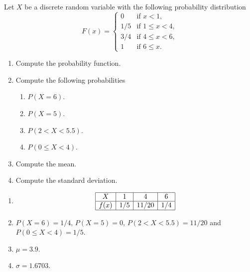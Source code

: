 {Let $X$ be a discrete random variable with the following probability distribution
\[
F(x)=
\begin{cases}
0 & \text{if $x<1$,} \\
1/5 & \text{if $1\leq x< 4$,} \\
3/4 & \text{if $4\leq x<6$,} \\
1 & \text{if $6\leq x$.}
\end{cases}
\]

\begin{enumerate}
\item  Compute the probability function.
\item  Compute the following probabilities
\begin{enumerate}
\item  $P(X=6)$.
\item  $P(X=5)$.
\item  $P(2<X<5.5)$.
\item  $P(0\leq X<4)$.
\end{enumerate}
\item Compute the mean. 
\item Compute the standard deviation. 
\end{enumerate}
}
{
\begin{enumerate}
\item \[
\begin{array}{|c|c|c|c|}
\hline
X & 1 & 4 & 6 \\
\hline
f(x) & 1/5 & 11/20 & 1/4\\
\hline
\end{array}
\]
\item $P(X=6)=1/4$, $P(X=5)=0$, $P(2<X<5.5)=11/20$ and $P(0\leq X<4)=1/5$.
\item $\mu=3.9$.
\item $\sigma=1.6703$.
\end{enumerate}
}
{}


